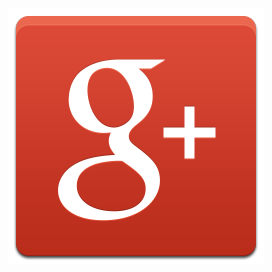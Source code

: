 \href{https://plus.google.com/u/0/+pjdelossantos}{\includegraphics[scale=0.1]{src/google_logo.png}}



